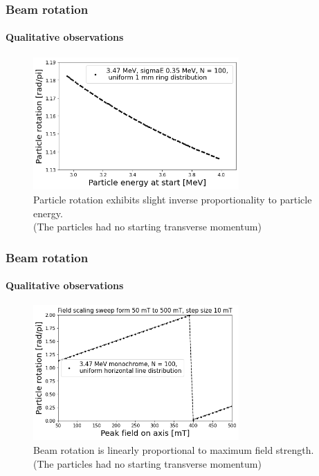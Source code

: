 \documentclass{beamer}
\begin{document}
\begin{frame}
  \frametitle{Beam rotation}
  \framesubtitle{Qualitative observations}
  \begin{figure}
    \includegraphics[width=0.7\textwidth]{rot_ring_3.47_pm10_100}
    \caption{Particle rotation exhibits slight inverse proportionality to particle energy.\\(The particles had no starting transverse momentum)}
  \end{figure}
\end{frame}

\begin{frame}
  \frametitle{Beam rotation}
  \framesubtitle{Qualitative observations}
  \begin{figure}
    \includegraphics[width=0.7\textwidth]{line_bmax_sweep}
    \caption{Beam rotation is linearly proportional to maximum field strength.\\(The particles had no starting transverse momentum)}
  \end{figure}
\end{frame}
\end{document}
